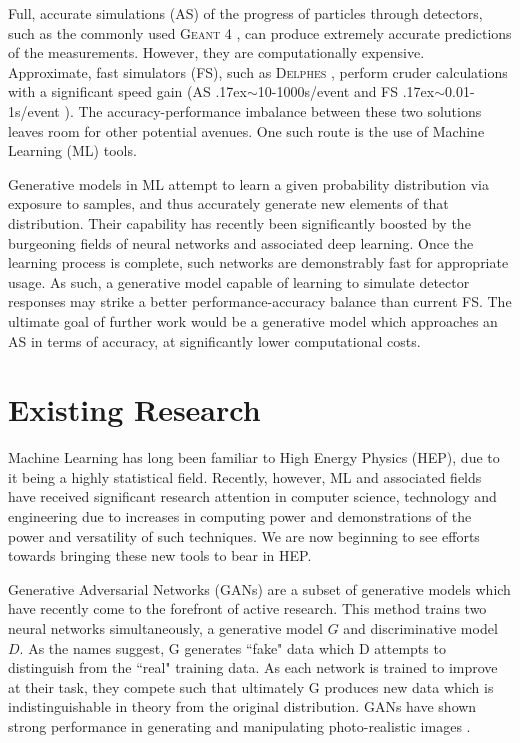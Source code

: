 \documentclass{report}
\newcommand{\pkg}[1]{\textsc{#1}}
\newcommand{\around}{{\raise.17ex\hbox{$\scriptstyle\sim$}}}
\begin{document}
Full, accurate simulations (AS) of the progress of particles through detectors, such as the commonly used \pkg{Geant} 4 \cite{geant4}, can produce extremely accurate predictions of the measurements. However, they are computationally expensive. Approximate, fast simulators (FS), such as \pkg{Delphes} \cite{delphes}, perform cruder calculations with a significant speed gain (AS \around10-1000s/event and FS \around0.01-1s/event \cite{delphessl}). The accuracy-performance imbalance between these two solutions leaves room for other potential avenues. One such route is the use of Machine Learning (ML) tools.

Generative models in ML attempt to learn a given probability distribution via exposure to samples, and thus accurately generate new elements of that distribution. Their capability has recently been significantly boosted by the burgeoning fields of neural networks and associated deep learning. Once the learning process is complete, such networks are demonstrably fast for appropriate usage. As such, a generative model capable of learning to simulate detector responses may strike a better performance-accuracy balance than current FS. The ultimate goal of further work would be a generative model which approaches an AS in terms of accuracy, at significantly lower computational costs.

\section{Existing Research}

Machine Learning has long been familiar to High Energy Physics (HEP), due to it being a highly statistical field. Recently, however, ML and associated fields have received significant research attention in computer science, technology and engineering due to increases in computing power and demonstrations of the power and versatility of such techniques. We are now beginning to see efforts towards bringing these new tools to bear in HEP.

Generative Adversarial Networks (GANs) \cite{gan1} are a subset of generative models which have recently come to the forefront of active research. This method trains two neural networks simultaneously, a generative model $G$ and discriminative model $D$. As the names suggest, G generates ``fake" data which D attempts to distinguish from the ``real" training data. As each network is trained to improve at their task, they compete such that ultimately G produces new data which is indistinguishable in theory from the original distribution. GANs have shown strong performance in generating and manipulating photo-realistic images \cite{Radford2015,odena2016conditional,learnww,text2im,GoodfellowNips}.
\end{document}
